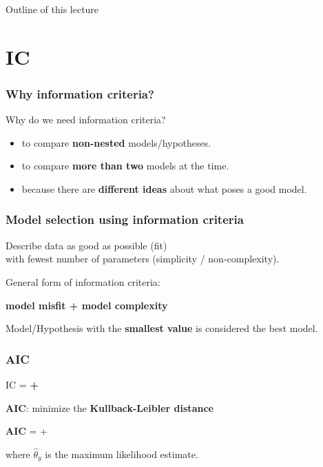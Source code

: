 \documentclass[10pt]{beamer}\usepackage[]{graphicx}\usepackage[]{xcolor}
\begin{document}
%
\begin{frame}{Outline of this lecture}
\tableofcontents[hidesubsections]
\end{frame}
%
\section{IC}
%
%
\begin{frame}
	\frametitle{Why information criteria?}
	Why do we need information criteria?
	\begin{itemize}
		\item to compare \textbf{non-nested} models/hypotheses.
		\item to compare \textbf{more than two} models at the time.
		\item because there are \textbf{different ideas} about what poses a good model.
	\end{itemize}
	
\end{frame}
%
\begin{frame}
	\frametitle{Model selection using information criteria}
	
	Describe data as good as possible (fit) \\
  with fewest number of parameters (simplicity / non-complexity).
	
	\bigskip
	
	\begin{block}{General form of information criteria:}
		\bigskip
		{\centerline{
				\textbf{model misfit + model complexity}}
		}
	\end{block}

	\bigskip
	Model/Hypothesis with the \textbf{smallest value} is considered the best model.
\end{frame}
%
\begin{frame}
	\frametitle{AIC}
	
	\centerline{	IC = \textbf{{\color{orange}{model misfit}} + {\color{purple}{model complexity}}}}
	\vspace{.5 cm}
	
	{\textbf{AIC}: minimize the \textbf{Kullback-Leibler distance}}

	\vspace{1cm}
	\centerline{{\textbf{AIC} ={} + \color{purple}{$2 p$}}}
	
	\vspace{.5 cm}
	where $\hat{\theta}_y$ is the maximum likelihood estimate.
	
\end{frame}
\end{document}
